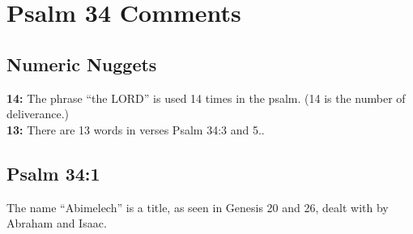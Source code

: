 \section{Psalm 34 Comments}

\subsection{Numeric Nuggets}
\textbf{14: } The phrase ``the LORD'' is used 14 times in the psalm. (14 is the number of deliverance.)\\
\noindent \textbf{13: } There are 13 words in verses Psalm 34:3 and 5..

\subsection{Psalm 34:1}
The name ``Abimelech'' is a title, as seen in Genesis 20 and 26, dealt with by Abraham and Isaac.